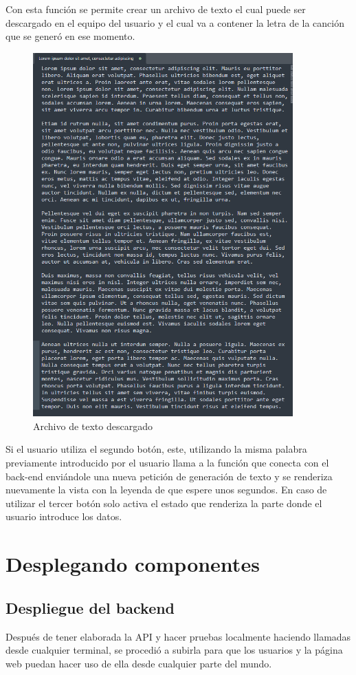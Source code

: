 \documentclass[12pt, a4paper, titlepage]{report}
\begin{document}
\begin{center}
	
\end{center}
Con esta función se permite crear un archivo de texto el cual puede ser descargado en el equipo del usuario y el cual va a contener la letra de la canción que se generó en ese momento.
\begin{figure}[H]
	\includegraphics[width=10cm]{./imagenes/Desarrollo/AplicacionWeb/Archivo.png}
	\centering 
	\caption{Archivo de texto descargado}
\end{figure}	
Si el usuario utiliza el segundo botón, este, utilizando la misma palabra previamente introducido por el usuario llama a la función que conecta con el back-end enviándole una nueva petición de generación de texto y se renderiza nuevamente la vista con la leyenda de que espere unos segundos. En caso de utilizar el tercer botón solo activa el estado que renderiza la parte donde el usuario introduce los datos.
\newpage
\section{Desplegando componentes}

\subsection{Despliegue del backend}
Después de tener elaborada la API y hacer pruebas localmente haciendo llamadas desde cualquier terminal, se procedió a subirla para que los usuarios y la página web puedan hacer uso de ella desde cualquier parte del mundo.
\end{document}
